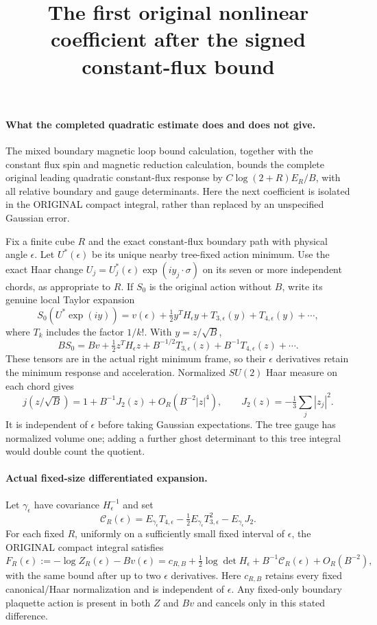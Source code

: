 \documentclass[11pt]{article}
\title{The first original nonlinear coefficient after the signed constant-flux bound}\author{}\date{}
\begin{document}
\maketitle
\paragraph{What the completed quadratic estimate does and does not give.}
The mixed boundary magnetic loop bound calculation, together with the constant flux spin and magnetic reduction calculation,
bounds the complete original leading quadratic constant-flux response by
$C\log(2+R)E_R/B$, with all relative boundary and gauge determinants.
Here the next coefficient is isolated in the ORIGINAL compact integral,
rather than replaced by an unspecified Gaussian error.

Fix a finite cube $R$ and the exact constant-flux boundary path with
physical angle $\epsilon$. Let $U^*(\epsilon)$ be its unique nearby
tree-fixed action minimum. Use the exact Haar change
$U_j=U_j^*(\epsilon)\exp(i y_j\cdot\sigma)$ on its seven or more independent
chords, as appropriate to $R$. If $S_0$ is the original action without $B$,
write its genuine local Taylor expansion
\[
 S_0(U^*\exp(iy))=v(\epsilon)+\tfrac12 y^TH_\epsilon y
       +T_{3,\epsilon}(y)+T_{4,\epsilon}(y)+\cdots ,
\]
where $T_k$ includes the factor $1/k!$. With $y=z/\sqrt B$,
\[
 BS_0=Bv+\tfrac12z^TH_\epsilon z+
 B^{-1/2}T_{3,\epsilon}(z)+B^{-1}T_{4,\epsilon}(z)+\cdots .
\]
These tensors are in the actual right minimum frame, so their
$\epsilon$ derivatives retain the minimum response and acceleration.
Normalized $SU(2)$ Haar measure on each chord gives
\[
 j(z/\sqrt B)=1+B^{-1}J_2(z)+O_R(B^{-2}|z|^4),\qquad
 J_2(z)=-\tfrac13\sum_j|z_j|^2 .
\]
It is independent of $\epsilon$ before taking Gaussian expectations.
The tree gauge has normalized volume one; adding a further ghost
determinant to this tree integral would double count the quotient.

\paragraph{Actual fixed-size differentiated expansion.}
Let $\gamma_\epsilon$ have covariance $H_\epsilon^{-1}$ and set
\[
 \mathcal C_R(\epsilon)=
 E_{\gamma_\epsilon}T_{4,\epsilon}
 -\tfrac12E_{\gamma_\epsilon}T_{3,\epsilon}^2
 -E_{\gamma_\epsilon}J_2.                                      \tag{1}
\]
For each fixed $R$, uniformly on a sufficiently small fixed interval of
$\epsilon$, the ORIGINAL compact integral satisfies
\[
 F_R(\epsilon):=-\log Z_R(\epsilon)-Bv(\epsilon)
 =c_{R,B}+\tfrac12\log\det H_\epsilon
       +B^{-1}\mathcal C_R(\epsilon)+O_R(B^{-2}),                  \tag{2}
\]
with the same bound after up to two $\epsilon$ derivatives.
Here $c_{R,B}$ retains every fixed canonical/Haar normalization and is
independent of $\epsilon$. Any fixed-only boundary plaquette action is
present in both $Z$ and $Bv$ and cancels only in this stated difference.
\end{document}
